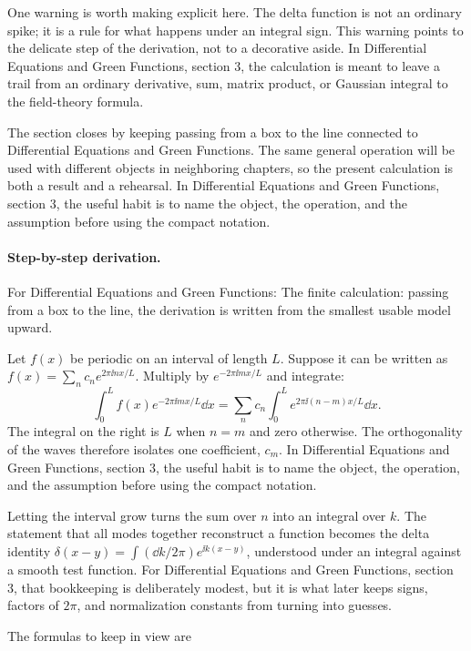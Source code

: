 One warning is worth making explicit here.  The delta function is not an ordinary spike; it is a rule for what happens under an integral sign.  This warning points to the delicate step of the derivation, not to a decorative aside.  In Differential Equations and Green Functions, section 3, the calculation is meant to leave a trail from an ordinary derivative, sum, matrix product, or Gaussian integral to the field-theory formula.

The section closes by keeping passing from a box to the line connected to Differential Equations and Green Functions.  The same general operation will be used with different objects in neighboring chapters, so the present calculation is both a result and a rehearsal.  In Differential Equations and Green Functions, section 3, the useful habit is to name the object, the operation, and the assumption before using the compact notation.



\paragraph{Step-by-step derivation.}

For Differential Equations and Green Functions: The finite calculation: passing from a box to the line, the derivation is written from the smallest usable model upward.

Let \(f(x)\) be periodic on an interval of length \(L\).  Suppose it can be written as \(f(x)=\sum_n c_ne^{2\pi\ii nx/L}\).  Multiply by \(e^{-2\pi\ii mx/L}\) and integrate:
\[
  \int_0^L f(x)e^{-2\pi\ii mx/L}\dd x
  =
  \sum_n c_n\int_0^L e^{2\pi\ii(n-m)x/L}\dd x.
\]
The integral on the right is \(L\) when \(n=m\) and zero otherwise.  The orthogonality of the waves therefore isolates one coefficient, \(c_m\).  In Differential Equations and Green Functions, section 3, the useful habit is to name the object, the operation, and the assumption before using the compact notation.

Letting the interval grow turns the sum over \(n\) into an integral over \(k\).  The statement that all modes together reconstruct a function becomes the delta identity \(\delta(x-y)=\int(\dd k/2\pi)e^{\ii k(x-y)}\), understood under an integral against a smooth test function.  For Differential Equations and Green Functions, section 3, that bookkeeping is deliberately modest, but it is what later keeps signs, factors of \(2\pi\), and normalization constants from turning into guesses.

The formulas to keep in view are

